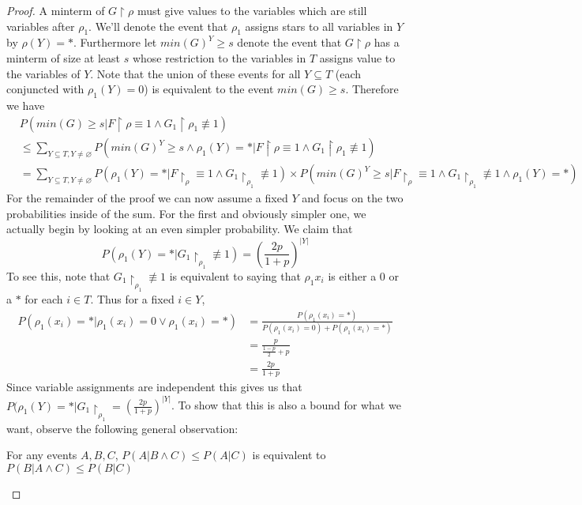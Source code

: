 \documentclass{article}
\theoremstyle{definition}
\theoremstyle{plain}
\theoremstyle{theorem}
\begin{document}
\begin{proof}
A minterm of $G \restriction \rho$ must give values to the variables which are still variables after $\rho_1$. We'll denote the event that $\rho_1$ assigns stars to all variables in $Y$ by $\rho(Y) = *$. Furthermore let $min(G)^Y \geq s$ denote the event that $G \restriction \rho$ has a minterm of size at least $s$ whose restriction to the variables in $T$ assigns value to the variables of $Y$. Note that the union of these events for all $Y \subseteq T$ (each conjuncted with $\rho_1(Y) = 0$) is equivalent to the event $min(G) \geq s$. Therefore we have
\begin{align*}
	& P(min(G) \geq s | F \restriction \rho \equiv 1 \wedge G_1 \restriction \rho_1 \not\equiv 1) \\
	&\leq \sum_{Y \subseteq T, Y \neq \varnothing} P(min(G)^Y \geq s \wedge \rho_1(Y) = * | F\restriction \rho \equiv 1 \wedge G_1 \restriction \rho_1 \not\equiv 1) \\
	&= \sum_{Y \subseteq T, Y \neq \varnothing} P(\rho_1(Y) = *|F \restriction_{\rho} \equiv 1 \wedge G_1 \restriction_{\rho_1} \not\equiv 1) \times P(min(G)^Y \geq s | F \restriction_{\rho} \equiv 1 \wedge G_1 \restriction_{\rho_1} \not\equiv 1 \wedge \rho_1(Y) = *)
\end{align*} 
For the remainder of the proof we can now assume a fixed $Y$ and focus on the two probabilities inside of the sum. For the first and obviously simpler one, we actually begin by looking at an even simpler probability. We claim that 
\[ P(\rho_1(Y) = *| G_1 \restriction_{\rho_1} \not\equiv 1) = \left( \frac{2p}{1+p} \right)^{|Y|} \]
To see this, note that $G_1 \restriction_{\rho_1} \not\equiv 1$ is equivalent to saying that $\rho_1{x_i}$ is either a $0$ or a $*$ for each $i \in T$. Thus for a fixed $i \in Y$, 
\begin{align*}
	P(\rho_1(x_i) = * | \rho_1(x_i) = 0 \vee \rho_1(x_i) = *) &= \frac{P(\rho_1(x_i) = *)}{P(\rho_1(x_i) = 0) + P(\rho_1(x_i) = *)} \\
	&= \frac{p}{\frac{1-p}{2} + p} \\
	&= \frac{2p}{1+p}
\end{align*} 
Since variable assignments are independent this gives us that $P(\rho_1(Y) = *|G_1 \restriction_{\rho_1} = \left( \frac{2p}{1+p} \right)^{|Y|}$. To show that this is also a bound for what we want, observe the following general observation:
\begin{center}
	For any events $A,B,C$, $P(A | B \wedge C) \leq P(A|C)$ is equivalent to $P(B|A \wedge C) \leq P(B|C)$
\end{center}

\end{proof}
\end{document}
